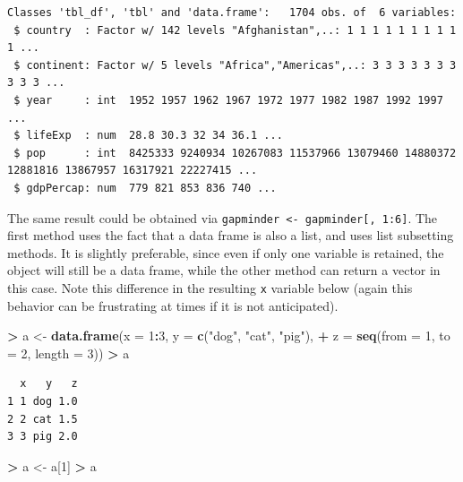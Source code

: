\documentclass[
]{krantz}
\makeatletter
\newenvironment{Shaded}{\begin{snugshade}}{\end{snugshade}}
\newcommand{\DataTypeTok}[1]{\textcolor[rgb]{0.27,0.27,0.27}{#1}}
\newcommand{\DecValTok}[1]{\textcolor[rgb]{0.06,0.06,0.06}{#1}}
\newcommand{\KeywordTok}[1]{\textcolor[rgb]{0.27,0.27,0.27}{\textbf{#1}}}
\newcommand{\NormalTok}[1]{#1}
\newcommand{\OperatorTok}[1]{\textcolor[rgb]{0.43,0.43,0.43}{\textbf{#1}}}
\newcommand{\StringTok}[1]{\textcolor[rgb]{0.5,0.5,0.5}{#1}}
\newenvironment{kframe}{%
\medskip{}
\setlength{\fboxsep}{.8em}
 \def\at@end@of@kframe{}%
 \ifinner\ifhmode%
  \def\at@end@of@kframe{\end{minipage}}%
  \begin{minipage}{\columnwidth}%
 \fi\fi%
 \def\FrameCommand##1{\hskip\@totalleftmargin \hskip-\fboxsep
 \colorbox{shadecolor}{##1}\hskip-\fboxsep
     \hskip-\linewidth \hskip-\@totalleftmargin \hskip\columnwidth}%
 \MakeFramed {\advance\hsize-\width
   \@totalleftmargin\z@ \linewidth\hsize
   \@setminipage}}%
 {\par\unskip\endMakeFramed%
 \at@end@of@kframe}
\renewenvironment{Shaded}{\begin{kframe}}{\end{kframe}}
\makeatother
\begin{document}
\begin{verbatim}
Classes 'tbl_df', 'tbl' and 'data.frame':   1704 obs. of  6 variables:
 $ country  : Factor w/ 142 levels "Afghanistan",..: 1 1 1 1 1 1 1 1 1 1 ...
 $ continent: Factor w/ 5 levels "Africa","Americas",..: 3 3 3 3 3 3 3 3 3 3 ...
 $ year     : int  1952 1957 1962 1967 1972 1977 1982 1987 1992 1997 ...
 $ lifeExp  : num  28.8 30.3 32 34 36.1 ...
 $ pop      : int  8425333 9240934 10267083 11537966 13079460 14880372 12881816 13867957 16317921 22227415 ...
 $ gdpPercap: num  779 821 853 836 740 ...
\end{verbatim}

The same result could be obtained via \texttt{gapminder\ \textless{}-\ gapminder{[},\ 1:6{]}}. The first method uses the fact that a data frame is also a list, and uses list subsetting methods. It is slightly preferable, since even if only one variable is retained, the object will still be a data frame, while the other method can return a vector in this case. Note this difference in the resulting \texttt{x} variable below (again this behavior can be frustrating at times if it is not anticipated).

\begin{Shaded}
\begin{Highlighting}[]
\OperatorTok{\textgreater{}}\StringTok{ }\NormalTok{a \textless{}{-}}\StringTok{ }\KeywordTok{data.frame}\NormalTok{(}\DataTypeTok{x =} \DecValTok{1}\OperatorTok{:}\DecValTok{3}\NormalTok{, }\DataTypeTok{y =} \KeywordTok{c}\NormalTok{(}\StringTok{"dog"}\NormalTok{, }\StringTok{"cat"}\NormalTok{, }\StringTok{"pig"}\NormalTok{), }
\OperatorTok{+}\StringTok{                 }\DataTypeTok{z =} \KeywordTok{seq}\NormalTok{(}\DataTypeTok{from =} \DecValTok{1}\NormalTok{, }\DataTypeTok{to =} \DecValTok{2}\NormalTok{, }\DataTypeTok{length =} \DecValTok{3}\NormalTok{))}
\OperatorTok{\textgreater{}}\StringTok{ }\NormalTok{a}
\end{Highlighting}
\end{Shaded}

\begin{verbatim}
  x   y   z
1 1 dog 1.0
2 2 cat 1.5
3 3 pig 2.0
\end{verbatim}

\begin{Shaded}
\begin{Highlighting}[]
\OperatorTok{\textgreater{}}\StringTok{ }\NormalTok{a \textless{}{-}}\StringTok{ }\NormalTok{a[}\DecValTok{1}\NormalTok{]}
\OperatorTok{\textgreater{}}\StringTok{ }\NormalTok{a }
\end{Highlighting}
\end{Shaded}
\end{document}
